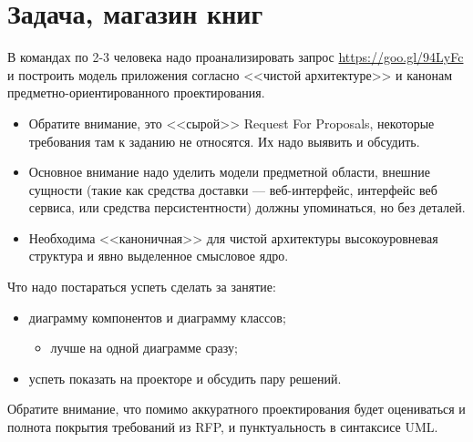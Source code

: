 \documentclass{../../text-style}
\begin{document}
\maketitle
\thispagestyle{empty}

\section{Задача, магазин книг}

В командах по 2-3 человека надо проанализировать запрос \url{ https://goo.gl/94LyFc} и построить модель приложения согласно <<чистой архитектуре>> и канонам предметно-ориентированного проектирования.

\begin{itemize}
    \item Обратите внимание, это <<сырой>> Request For Proposals, некоторые требования там к заданию не относятся. Их надо выявить и обсудить.
    \item Основное внимание надо уделить модели предметной области, внешние сущности (такие как средства доставки --- веб-интерфейс, интерфейс веб сервиса, или средства персистентности) должны упоминаться, но без деталей.
    \item Необходима <<каноничная>> для чистой архитектуры высокоуровневая структура и явно выделенное смысловое ядро.
\end{itemize}

Что надо постараться успеть сделать за занятие:

\begin{itemize}
    \item диаграмму компонентов и диаграмму классов;
    \begin{itemize}
        \item лучше на одной диаграмме сразу;
    \end{itemize}
    \item успеть показать на проекторе и обсудить пару решений.
\end{itemize}

Обратите внимание, что помимо аккуратного проектирования будет оцениваться и полнота покрытия требований из RFP, и пунктуальность в синтаксисе UML.
\end{document}
